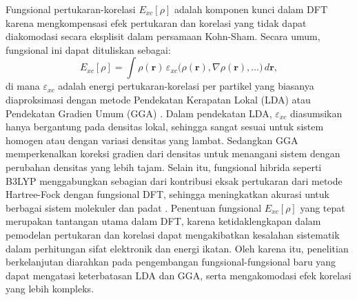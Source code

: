Fungsional pertukaran-korelasi \(E_{xc}[\rho]\) adalah komponen kunci dalam DFT karena mengkompensasi efek pertukaran dan korelasi yang tidak dapat diakomodasi secara eksplisit dalam persamaan Kohn-Sham.
Secara umum, fungsional ini dapat dituliskan sebagai:
\begin{equation}
    E_{xc}[\rho] = \int \rho(\mathbf{r})\,\varepsilon_{xc}\Big(\rho(\mathbf{r}), \nabla\rho(\mathbf{r}), \ldots\Big) \, d\mathbf{r},
\end{equation}
di mana \(\varepsilon_{xc}\) adalah energi pertukaran-korelasi per partikel yang biasanya diaproksimasi dengan metode Pendekatan Kerapatan Lokal (LDA) atau Pendekatan Gradien Umum (GGA) \cite{Perdew1996}.
Dalam pendekatan LDA, \(\varepsilon_{xc}\) diasumsikan hanya bergantung pada densitas lokal, sehingga sangat sesuai untuk sistem homogen atau dengan variasi densitas yang lambat.
Sedangkan GGA memperkenalkan koreksi gradien dari densitas untuk menangani sistem dengan perubahan densitas yang lebih tajam.
Selain itu, fungsional hibrida seperti B3LYP menggabungkan sebagian dari kontribusi eksak pertukaran dari metode Hartree-Fock dengan fungsional DFT, sehingga meningkatkan akurasi untuk berbagai sistem molekuler dan padat \cite{Becke1993}.
Penentuan fungsional \(E_{xc}[\rho]\) yang tepat merupakan tantangan utama dalam DFT, karena ketidaklengkapan dalam pemodelan pertukaran dan korelasi dapat mengakibatkan kesalahan sistematik dalam perhitungan sifat elektronik dan energi ikatan.
Oleh karena itu, penelitian berkelanjutan diarahkan pada pengembangan fungsional-fungsional baru yang dapat mengatasi keterbatasan LDA dan GGA, serta mengakomodasi efek korelasi yang lebih kompleks.

